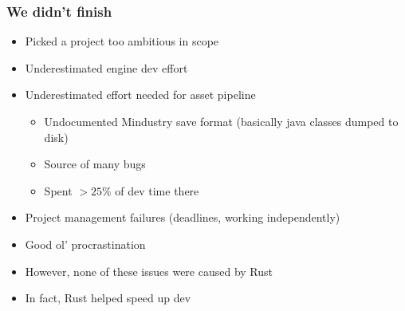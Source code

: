 \documentclass{beamer}
\begin{document}
\begin{frame}
	\frametitle{We didn't finish}
	\begin{itemize}
		\item Picked a project too ambitious in scope
		\item Underestimated engine dev effort
		\item Underestimated effort needed for asset pipeline \begin{itemize}
			      \item Undocumented Mindustry save format (basically java classes dumped to disk)
			      \item Source of many bugs
			      \item Spent $>25\%$ of dev time there
		      \end{itemize}
		\item Project management failures (deadlines, working independently)
		\item Good ol' procrastination
		\item However, none of these issues were caused by Rust
		\item In fact, Rust helped speed up dev
	\end{itemize}
\end{frame}

\end{document}
